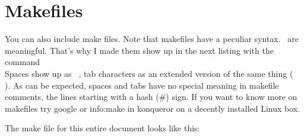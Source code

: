 \section{Makefiles}
You can also include make files.
Note that makefiles have a peculiar syntax. \ are meaningful. 
That's why I made them show up in the next listing with the command\\

\lstset{showspaces=true,showtabs=true}
Spaces show up as \lstinline| |, tab characters as an extended version
of the same thing (\lstinline|	|). 
As can be expected, spaces and tabs have no special meaning in
makefile comments, the lines starting with a hash (\#) sign. 
If you want to know more on makefiles try google or info:make in
konqueror on a decently installed Linux box.  

The make file for this entire document looks like this:



